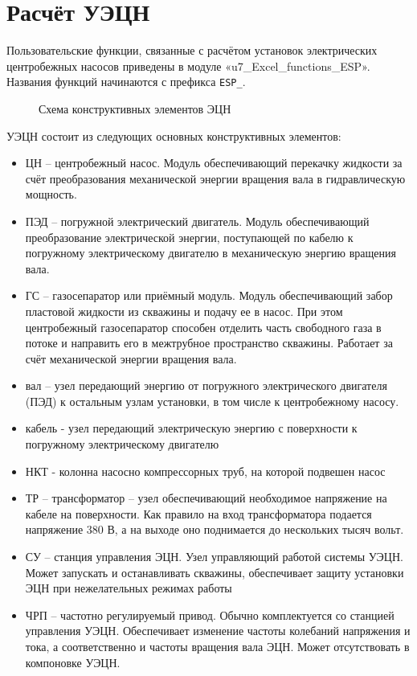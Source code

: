 \section{Расчёт УЭЦН}
Пользовательские функции, связанные с расчётом установок электрических центробежных насосов приведены в модуле «u7\_Excel\_functions\_ESP».  Названия функций начинаются с префикса \texttt{ESP_}. 

\begin{figure}[H]
	\begin{center}
		
		\caption{Схема конструктивных элементов ЭЦН}
		\label{ris:ESP_well_1}
	\end{center}
\end{figure}

УЭЦН состоит из следующих основных конструктивных элементов:
\begin{itemize}
	\item ЦН -- центробежный насос. Модуль обеспечивающий перекачку жидкости за счёт преобразования механической энергии вращения вала в гидравлическую мощность. 
	\item ПЭД -- погружной электрический двигатель. Модуль обеспечивающий преобразование электрической энергии, поступающей по кабелю к погружному электрическому двигателю в механическую энергию вращения вала.
	\item ГС -- газосепаратор или приёмный модуль. Модуль обеспечивающий забор пластовой жидкости из скважины и подачу ее в насос. При этом центробежный газосепаратор способен отделить часть свободного газа в потоке и направить его в межтрубное пространство скважины. Работает за счёт механической энергии вращения вала.
	\item вал -- узел передающий энергию от погружного электрического двигателя (ПЭД) к остальным узлам установки, в том числе к центробежному насосу.
	\item кабель - узел передающий электрическую энергию с поверхности к погружному электрическому двигателю
	\item НКТ - колонна насосно компрессорных труб, на которой подвешен насос
	\item ТР -- трансформатор -- узел обеспечивающий необходимое напряжение на кабеле на поверхности. Как правило на вход трансформатора подается напряжение 380 В, а на выходе оно поднимается до нескольких тысяч вольт. 
	\item СУ -- станция управления ЭЦН. Узел управляющий работой системы УЭЦН. Может запускать и  останавливать скважины, обеспечивает защиту установки ЭЦН при нежелательных режимах работы
	\item ЧРП -- частотно регулируемый привод. Обычно комплектуется со станцией управления УЭЦН. Обеспечивает изменение частоты колебаний напряжения и тока, а соответственно и частоты вращения вала ЭЦН. Может отсутствовать в компоновке УЭЦН. 
\end{itemize}

